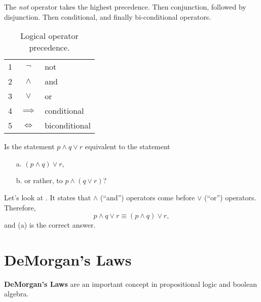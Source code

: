 The \emph{not} operator takes the highest precedence.
Then conjunction, followed by disjunction.
Then conditional, and finally bi-conditional operators.
\begin{table}[H]
  \centering
    \begin{tabular}{r|cl}
      1 & $\neg$      &not\\
      2 & $\land$     &and \\
      3 & $\lor$      & or \\
      4 & $\implies$  & conditional \\
      5 & $\iff$      &biconditional
    \end{tabular}
  \caption{Logical operator precedence.}
  \label{tab:precedence}
\end{table}
\begin{ex}
    Is the statement $ p \land q \lor r $ equivalent to the statement
    \begin{enumerate}
        \item[a.] $(p \land q ) \lor r$,
        \item[b.] or rather, to $ p \land (q \lor r)$?
    \end{enumerate}
    \begin{sol}
        Let's look at .
        It states that $\land$ (``and'') operators come before $\lor$ (``or'') operators.
        Therefore,
        \[ p \land q \lor r \equiv (p \land q) \lor r,\]
        and (a) is the correct answer.
    \end{sol}
\end{ex}

\section{DeMorgan's Laws}
\textbf{DeMorgan's Laws} are an important concept in propositional logic and boolean algebra.

